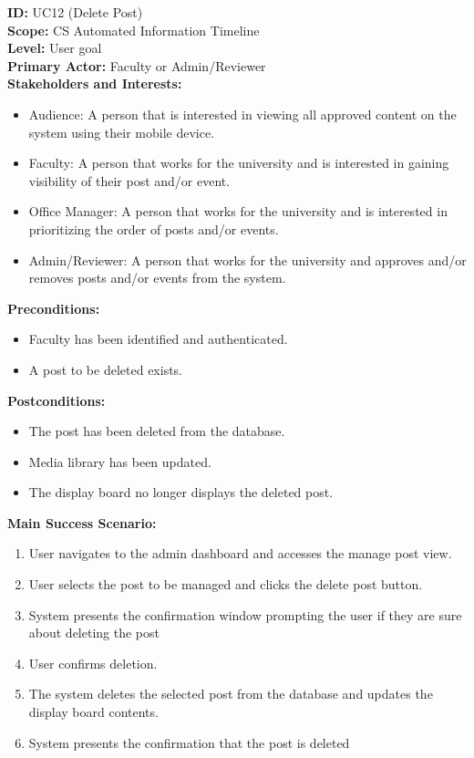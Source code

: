 \textbf{ID:} UC12 (Delete Post) \\
\textbf{Scope:} CS Automated Information Timeline \\
\textbf{Level:} User goal \\
\textbf{Primary Actor:} Faculty or Admin/Reviewer \\
\textbf{Stakeholders and Interests: }
\begin{itemize}
    \item Audience: A person that is interested in viewing all approved content on the system using their mobile device.
    \item Faculty: A person that works for the university and is interested in gaining visibility of their post and/or event.
    \item Office Manager: A person that works for the university and is interested in prioritizing the order of posts and/or events.
    \item Admin/Reviewer: A person that works for the university and approves and/or removes posts and/or events from the system.
\end{itemize}
\textbf{Preconditions:}
\begin{itemize}
    \item Faculty has been identified and authenticated.
    \item A post to be deleted exists.
\end{itemize}
\textbf{Postconditions:}
\begin{itemize}
    \item The post has been deleted from the database.
    \item Media library has been updated.
    \item The display board no longer displays the deleted post.
\end{itemize}
\textbf{Main Success Scenario: }
\begin{enumerate}
    \item User navigates to the admin dashboard and accesses the manage post view.
    \item User selects the post to be managed and clicks the delete post button.
    \item System presents the confirmation window prompting the user if they are sure about deleting the post
    \item User confirms deletion.
    \item The system deletes the selected post from the database and updates the display board contents.
    \item System presents the confirmation that the post is deleted
\end{enumerate}
